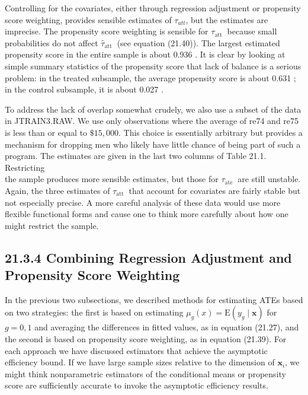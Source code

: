 \documentclass[10pt]{article}
\begin{document}
Controlling for the covariates, either through regression adjustment or propensity score weighting, provides sensible estimates of $\tau_{a t t}$, but the estimates are imprecise. The propensity score weighting is sensible for $\tau_{\text {att }}$ because small probabilities do not affect $\hat{\tau}_{\text {att }}$ (see equation (21.40)). The largest estimated propensity score in the entire sample is about 0.936 . It is clear by looking at simple summary statistics of the propensity score that lack of balance is a serious problem: in the treated subsample, the average propensity score is about 0.631 ; in the control subsample, it is about 0.027 .

To address the lack of overlap somewhat crudely, we also use a subset of the data in JTRAIN3.RAW. We use only observations where the average of re74 and re75 is less than or equal to $\$ 15,000$. This choice is essentially arbitrary but provides a mechanism for dropping men who likely have little chance of being part of such a program. The estimates are given in the last two columns of Table 21.1. Restricting\\
the sample produces more sensible estimates, but those for $\tau_{\text {ate }}$ are still unstable. Again, the three estimates of $\tau_{\text {att }}$ that account for covariates are fairly stable but not especially precise. A more careful analysis of these data would use more flexible functional forms and cause one to think more carefully about how one might restrict the sample.

\subsection*{21.3.4 Combining Regression Adjustment and Propensity Score Weighting}
In the previous two subsections, we described methods for estimating ATEs based on two strategies: the first is based on estimating $\mu_{g}(x)=\mathrm{E}\left(y_{g} \mid \mathbf{x}\right)$ for $g=0,1$ and averaging the differences in fitted values, as in equation (21.27), and the second is based on propensity score weighting, as in equation (21.39). For each approach we have discussed estimators that achieve the asymptotic efficiency bound. If we have large sample sizes relative to the dimension of $\mathbf{x}_{i}$, we might think nonparametric estimators of the conditional means or propensity score are sufficiently accurate to invoke the asymptotic efficiency results.
\end{document}
